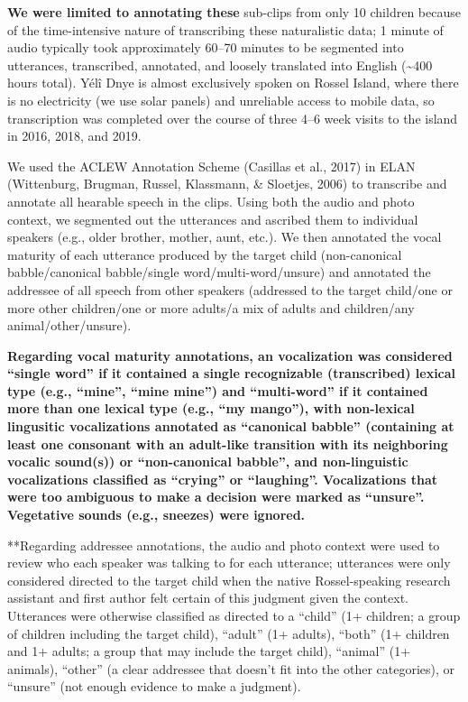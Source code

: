 \documentclass[,man,floatsintext]{apa6}
\begin{document}
\textbf{We were limited to annotating these} sub-clips from only 10
children because of the time-intensive nature of transcribing these
naturalistic data; 1 minute of audio typically took approximately 60--70
minutes to be segmented into utterances, transcribed, annotated, and
loosely translated into English (\textasciitilde{}400 hours total). Yélî
Dnye is almost exclusively spoken on Rossel Island, where there is no
electricity (we use solar panels) and unreliable access to mobile data,
so transcription was completed over the course of three 4--6 week visits
to the island in 2016, 2018, and 2019.

We used the ACLEW Annotation Scheme (Casillas et al., 2017) in ELAN
(Wittenburg, Brugman, Russel, Klassmann, \& Sloetjes, 2006) to
transcribe and annotate all hearable speech in the clips. Using both the
audio and photo context, we segmented out the utterances and ascribed
them to individual speakers (e.g., older brother, mother, aunt, etc.).
We then annotated the vocal maturity of each utterance produced by the
target child (non-canonical babble/canonical babble/single
word/multi-word/unsure) and annotated the addressee of all speech from
other speakers (addressed to the target child/one or more other
children/one or more adults/a mix of adults and children/any
animal/other/unsure).

\textbf{Regarding vocal maturity annotations, an vocalization was
considered \enquote{single word} if it contained a single recognizable
(transcribed) lexical type (e.g., \enquote{mine}, \enquote{mine mine})
and \enquote{multi-word} if it contained more than one lexical type
(e.g., \enquote{my mango}), with non-lexical lingusitic vocalizations
annotated as \enquote{canonical babble} (containing at least one
consonant with an adult-like transition with its neighboring vocalic
sound(s)) or \enquote{non-canonical babble}, and non-linguistic
vocalizations classified as \enquote{crying} or \enquote{laughing}.
Vocalizations that were too ambiguous to make a decision were marked as
\enquote{unsure}. Vegetative sounds (e.g., sneezes) were ignored.}

**Regarding addressee annotations, the audio and photo context were used
to review who each speaker was talking to for each utterance; utterances
were only considered directed to the target child when the native
Rossel-speaking research assistant and first author felt certain of this
judgment given the context. Utterances were otherwise classified as
directed to a \enquote{child} (1+ children; a group of children
including the target child), \enquote{adult} (1+ adults), \enquote{both}
(1+ children and 1+ adults; a group that may include the target child),
\enquote{animal} (1+ animals), \enquote{other} (a clear addressee that
doesn't fit into the other categories), or \enquote{unsure} (not enough
evidence to make a judgment).
\end{document}
